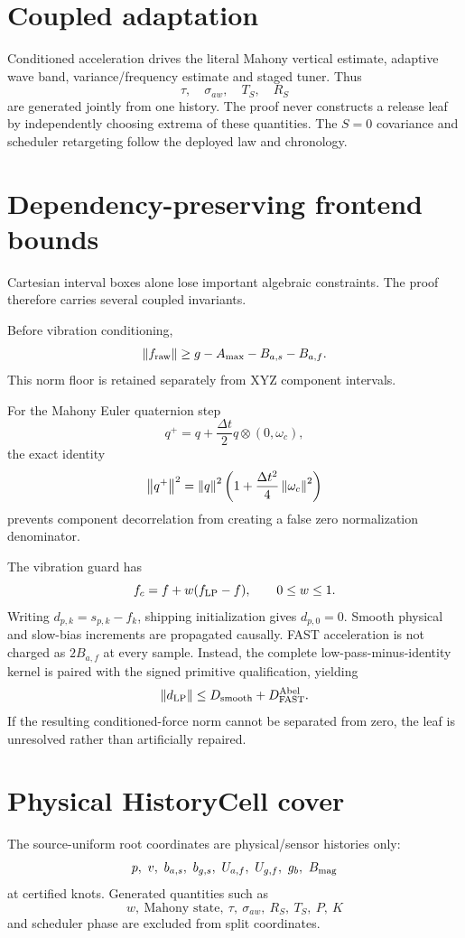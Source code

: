 \documentclass[journal]{IEEEtran}
\begin{document}
\section{Coupled adaptation}
Conditioned acceleration drives the literal Mahony vertical estimate, adaptive wave band, variance/frequency estimate and staged tuner. Thus
\[
\tau,\quad\sigma_{aw},\quad T_S,\quad R_S
\]
are generated jointly from one history. The proof never constructs a release leaf by independently choosing extrema of these quantities. The \(S=0\) covariance and scheduler retargeting follow the deployed law and chronology.

\section{Dependency-preserving frontend bounds}
Cartesian interval boxes alone lose important algebraic constraints. The proof therefore carries several coupled invariants.

Before vibration conditioning,
\[
\left\lVert f_{\rm raw}\right\rVert\ge g-A_{\max}-B_{a,s}-B_{a,f}.
\]
This norm floor is retained separately from XYZ component intervals.

For the Mahony Euler quaternion step
\[
q^+=q+\frac{\Delta t}{2}q\otimes(0,\omega_c),
\]
the exact identity
\[
\left\lVert q^+\right\rVert^2=\left\lVert q\right\rVert^2\left(1+\frac{\Delta t^2}{4}\left\lVert\omega_c\right\rVert^2\right)
\]
prevents component decorrelation from creating a false zero normalization denominator.

The vibration guard has
\[
f_c=f+w(f_{\rm LP}-f),\qquad0\le w\le1.
\]
Writing \(d_{p,k}=s_{p,k}-f_k\), shipping initialization gives \(d_{p,0}=0\). Smooth physical and slow-bias increments are propagated causally. FAST acceleration is not charged as \(2B_{a,f}\) at every sample. Instead, the complete low-pass-minus-identity kernel is paired with the signed primitive qualification, yielding
\[
\left\lVert d_{\rm LP}\right\rVert\le D_{\rm smooth}+D_{\rm FAST}^{\rm Abel}.
\]
If the resulting conditioned-force norm cannot be separated from zero, the leaf is unresolved rather than artificially repaired.

\section{Physical HistoryCell cover}
The source-uniform root coordinates are physical/sensor histories only:
\[
p,\ v,\ b_{a,s},\ b_{g,s},\ U_{a,f},\ U_{g,f},\
g_b,\ B_{\rm mag}
\]
at certified knots. Generated quantities such as
\[
w,\ \text{Mahony state},\ \tau,\ \sigma_{aw},\ R_S,\ T_S,\ P,\ K
\]
and scheduler phase are excluded from split coordinates.
\end{document}
